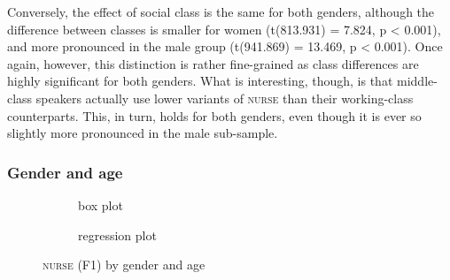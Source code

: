 Conversely, the effect of social class is the same for both genders, although the difference between classes is smaller for women (t(813.931) = 7.824, p < 0.001), and more pronounced in the male group (t(941.869) = 13.469, p < 0.001).
Once again, however, this distinction is rather fine-grained as class differences are highly significant for both genders.
What is interesting, though, is that middle-class speakers actually use lower variants of \textsc{nurse} than their working-class counterparts.
This, in turn, holds for both genders, even though it is ever so slightly more pronounced in the male sub-sample.

\subsubsection{Gender and age}
\label{sec.prod.res.vow.nurse.f1.genderage}

\begin{figure}[h!]
	\centering
	\begin{subfigure}{.49\textwidth}
		\centering
			\resizebox{\linewidth}{!}{} 
		\caption{box plot}
		\label{fig.box.f1w.nurse.genderage}
	\end{subfigure}
	\begin{subfigure}{.49\textwidth}
		\centering
			\resizebox{\linewidth}{!}{} 
		\caption{regression plot}
		\label{fig.scatter.f1w.nurse.genderage}
	\end{subfigure}
	\caption{\textsc{nurse} (F1) by gender and age}
\end{figure}

